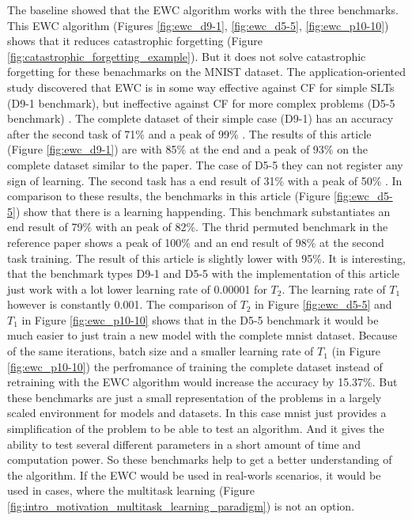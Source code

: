 The baseline showed that the EWC algorithm works with the three benchmarks.
This EWC algorithm (Figures \ref{fig:ewc_d9-1}, \ref{fig:ewc_d5-5}, \ref{fig:ewc_p10-10}) shows that it reduces catastrophic forgetting (Figure \ref{fig:catastrophic_forgetting_example}).
But it does not solve catastrophic forgetting for these benachmarks on the MNIST dataset.
\newline
The application-oriented study \cite{cf_application_oriented_study} discovered that EWC is in some way effective against CF for simple SLTs (D9-1 benchmark), but ineffective against CF for more complex problems (D5-5 benchmark) \cite{cf_application_oriented_study}.
The complete dataset of their simple case (D9-1) has an accuracy after the second task of 71\% and a peak of 99\% \cite{cf_application_oriented_study}.
The results of this article (Figure \ref{fig:ewc_d9-1}) are with 85\% at the end and a peak of 93\% on the complete dataset similar to the paper.
The case of D5-5 they can not register any sign of learning.
The second task has a end result of 31\% with a peak of 50\% \cite{cf_application_oriented_study}.
In comparison to these results, the benchmarks in this article (Figure \ref{fig:ewc_d5-5}) show that there is a learning happending.
This benchmark substantiates an end result of 79\% with an peak of 82\%.
The thrid permuted benchmark in the reference paper \cite{cf_application_oriented_study} shows a peak of 100\% and an end result of 98\% at the second task training.
The result of this article is slightly lower with 95\%.
\newline
It is interesting, that the benchmark types D9-1 and D5-5 with the implementation of this article just work with a lot lower learning rate of 0.00001 for $T_2$.
The learning rate of $T_1$ however is constantly 0.001.
\newline
The comparison of $T_2$ in Figure \ref{fig:ewc_d5-5} and $T_1$ in Figure \ref{fig:ewc_p10-10} shows that in the D5-5 benchmark it would be much easier to just train a new model with the complete mnist dataset.
Because of the same iterations, batch size and a smaller learning rate of $T_1$ (in Figure \ref{fig:ewc_p10-10}) the perfromance of training the complete dataset instead of retraining with the EWC algorithm would increase the accuracy by 15.37\%.
But these benchmarks are just a small representation of the problems in a largely scaled environment for models and datasets.
In this case mnist just provides a simplification of the problem to be able to test an algorithm.
And it gives the ability to test several different parameters in a short amount of time and computation power.
So these benchmarks help to get a better understanding of the algorithm.
If the EWC would be used in real-worls scenarios, it would be used in cases, where the multitask learning (Figure \ref{fig:intro_motivation_multitask_learning_paradigm}) is not an option.


